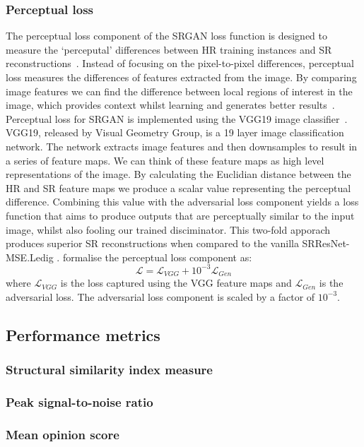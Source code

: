 \subsubsection{Perceptual loss}
The perceptual loss component of the SRGAN loss function is designed to measure the `perceputal' differences between HR training instances and SR reconstructions~\cite{srgan}. Instead of focusing on the pixel-to-pixel differences, perceptual loss measures the differences of features extracted from the image. By comparing image features we can find the difference between local regions of interest in the image, which provides context whilst learning and generates better results~\cite{ref}. Perceptual loss for SRGAN is implemented using the VGG19 image classifier~\cite{srgan}. VGG19, released by Visual Geometry Group, is a 19 layer image classification network. The network extracts image features and then downsamples to result in a series of feature maps. We can think of these feature maps as high level representations of the image. By calculating the Euclidian distance between the HR and SR feature maps we produce a scalar value representing the perceptual difference. Combining this value with the adversarial loss component yields a loss function that aims to produce outputs that are perceptually similar to the input image, whilst also fooling our trained disciminator. This two-fold apporach produces superior SR reconstructions when compared to the vanilla SRResNet-MSE.\@ Ledig \etal. formalise the perceptual loss component as:
\[\mathcal{L} = \mathcal{L}_{VGG} + 10^{-3} \mathcal{L}_{Gen}\]
where $\mathcal{L}_{VGG}$ is the loss captured using the VGG feature maps and $\mathcal{L}_{Gen}$ is the adversarial loss. The adversarial loss component is scaled by a factor of $10^{-3}$.

\subsection{Performance metrics}
\subsubsection{Structural similarity index measure}

\subsubsection{Peak signal-to-noise ratio}

\subsubsection{Mean opinion score}

